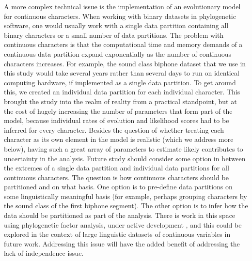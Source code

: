 A more complex technical issue is the implementation of an evolutionary model for continuous characters. When working with binary datasets in phylogenetic software, one would usually work with a single data partition containing all binary characters or a small number of data partitions. The problem with continuous characters is that the computational time and memory demands of a continuous data partition expand exponentially as the number of continuous characters increases. For example, the sound class biphone dataset that we use in this study would take several years rather than several days to run on identical computing hardware, if implemented as a single data partition. To get around this, we created an individual data partition for each individual character. This brought the study into the realm of reality from a practical standpoint, but at the cost of hugely increasing the number of parameters that form part of the model, because individual rates of evolution and likelihood scores had to be inferred for every character. Besides the question of whether treating each character as its own element in the model is realistic (which we address more below), having such a great array of parameters to estimate likely contributes to uncertainty in the analysis. Future study should consider some option in between the extremes of a single data partition and individual data partitions for all continuous characters. The question is how continuous characters should be partitioned and on what basis. One option is to pre-define data partitions on some linguistically meaningful basis (for example, perhaps grouping characters by the sound class of the first biphone segment). The other option is to infer how the data should be partitioned as part of the analysis. There is work in this space using phylogenetic factor analysis, under active development \autocites{tolkoff_phylogenetic_2018}{hassler_inferring_2020}, and this could be explored in the context of large linguistic datasets of continuous variables in future work. Addressing this issue will have the added benefit of addressing the lack of independence issue.

